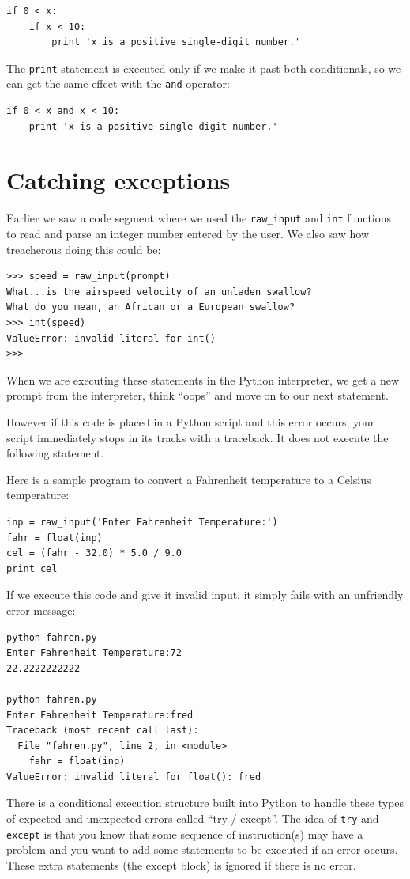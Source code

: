 \documentclass[10pt]{book}
\begin{document}
\beforeverb
\begin{verbatim}
if 0 < x:
    if x < 10:
        print 'x is a positive single-digit number.'
\end{verbatim}
\afterverb
%
The {\tt print} statement is executed only if we make it past both
conditionals, so we can get the same effect with the {\tt and} operator:

\beforeverb
\begin{verbatim}
if 0 < x and x < 10:
    print 'x is a positive single-digit number.'
\end{verbatim}
\afterverb


\section{Catching exceptions}
\label{catch1}

Earlier we saw a code segment where we used the \verb"raw_input" and
{\tt int} functions to read and parse an integer number entered by
the user.  We also saw how treacherous doing this could be:

\beforeverb
\begin{verbatim}
>>> speed = raw_input(prompt)
What...is the airspeed velocity of an unladen swallow?
What do you mean, an African or a European swallow?
>>> int(speed)
ValueError: invalid literal for int()
>>>
\end{verbatim}
\afterverb
%
When we are executing these statements in the Python interpreter, 
we get a new prompt from the interpreter, think ``oops'' and move 
on to our next statement.  

However if this code is placed in a 
Python script and this error occurs, your script immediately 
stops in its tracks with a traceback.  
It does not execute the following statement. 

Here is a sample program to convert a Fahrenheit temperature 
to a Celsius temperature:

\beforeverb
\begin{verbatim}
inp = raw_input('Enter Fahrenheit Temperature:')
fahr = float(inp)
cel = (fahr - 32.0) * 5.0 / 9.0
print cel
\end{verbatim}
\afterverb
%
If we execute this code and give it invalid input, it simply fails
with an unfriendly error message:

\beforeverb
\begin{verbatim}
python fahren.py 
Enter Fahrenheit Temperature:72
22.2222222222

python fahren.py 
Enter Fahrenheit Temperature:fred
Traceback (most recent call last):
  File "fahren.py", line 2, in <module>
    fahr = float(inp)
ValueError: invalid literal for float(): fred
\end{verbatim}
\afterverb
%
There is a conditional execution structure built into 
Python to handle these types of expected and unexpected
errors called ``try / except''.  The idea of {\tt try}
and {\tt except} is that you know that some sequence
of instruction(s) may have a problem and you want to 
add some statements to be executed if an error occurs.
These extra statements (the except block) is ignored
if there is no error.
\end{document}
